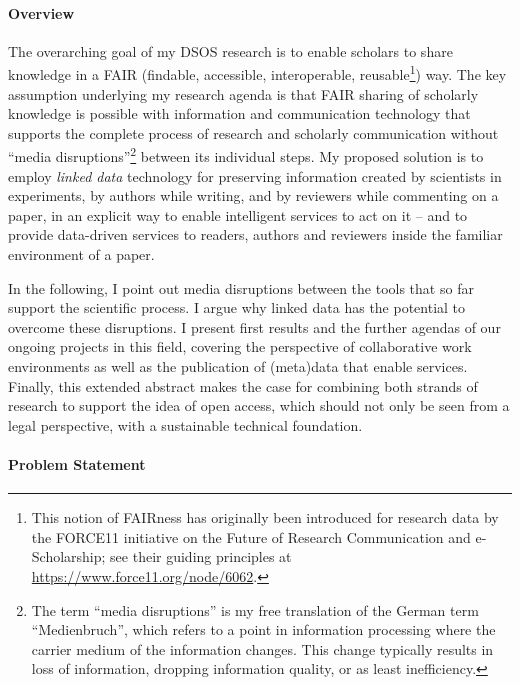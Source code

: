 \documentclass[a4paper,UKenglish]{dagrep}
\begin{document}
\paragraph{Overview}

The overarching goal of my DSOS research is to enable scholars to share
knowledge in a FAIR (findable, accessible, interoperable, reusable\footnote{%
This notion of FAIRness has originally been introduced for research data by the
FORCE11 initiative on the Future of Research Communication and e-Scholarship;
see their guiding principles at \url{https://www.force11.org/node/6062}.%
}) way.
The key assumption underlying my research agenda is that FAIR sharing of
scholarly knowledge is possible with information and communication technology
that supports the complete process of research and scholarly communication
without ``media disruptions''\footnote{%
The term ``media disruptions'' is my free translation of the German term
``Medienbruch'', which refers to a point in information processing where the
carrier medium of the information changes.
This change typically results in loss of information, dropping information
quality, or as least inefficiency.%
} between its individual steps.
My proposed solution is to employ \emph{linked data} technology for preserving
information created by scientists in experiments, by authors while writing, and
by reviewers while commenting on a paper, in an explicit way to enable
intelligent services to act on it – and to provide data-driven services to
readers, authors and reviewers inside the familiar environment of a paper.

In the following, I point out media disruptions between the tools that so far
support the scientific process.
I argue why linked data has the potential to overcome these disruptions.
I present first results and the further agendas of our ongoing projects in this
field, covering the perspective of collaborative work environments as well as
the publication of (meta)data that enable services.
Finally, this extended abstract makes the case for combining both strands of
research to support the idea of open access, which should not only be seen from
a legal perspective, with a sustainable technical foundation.

\paragraph{Problem Statement}
\end{document}
